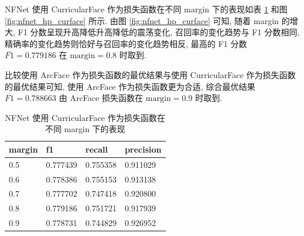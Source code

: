 \documentclass[12pt]{article}
\begin{document}
NFNet 使用 CurricularFace 作为损失函数在不同 margin 下的表现如表 \ref{tab:nfnet_hp_curface} 和图 \ref{fig:nfnet_hp_curface} 所示. 由图 \ref{fig:nfnet_hp_curface} 可知, 随着 margin 的增大, F1 分数呈现升高降低升高降低的震荡变化, 召回率的变化趋势与 F1 分数相同, 精确率的变化趋势则恰好与召回率的变化趋势相反, 最高的 F1 分数 $\overline{F1}=0.779186$ 在 $\text{margin} = 0.8$ 时取到.

比较使用 ArcFace 作为损失函数的最优结果与使用 CurricularFace 作为损失函数的最优结果可知, 使用 ArcFace 作为损失函数更为合适, 综合最优结果 $\overline{F1}=0.788663$ 由 ArcFace 损失函数在 $\text{margin} = 0.9$ 时取到.

\begin{table}[htbp]
  \centering
  \caption{NFNet 使用 CurricularFace 作为损失函数在不同 margin 下的表现}
  \label{tab:nfnet_hp_curface}
  \begin{tabular}{llll}
    \toprule
    margin & f1       & recall   & precision \\
    \midrule
    0.5 & 0.777439 & 0.755358 & 0.911029  \\
    0.6 & 0.778386 & 0.755153 & 0.913138  \\
    0.7 & 0.777702 & 0.747418 & 0.920800  \\
    0.8 & 0.779186 & 0.751721 & 0.917939  \\
    0.9 & 0.778731 & 0.744829 & 0.926952  \\
    \bottomrule
  \end{tabular}
\end{table}
\end{document}
